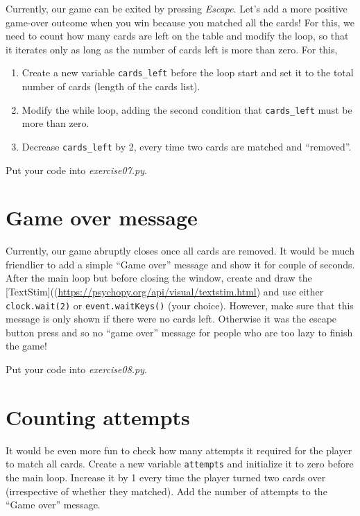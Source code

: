 \documentclass[
]{book}
\providecommand{\tightlist}{%
  \setlength{\itemsep}{0pt}\setlength{\parskip}{0pt}}
\begin{document}
Currently, our game can be exited by pressing \emph{Escape}. Let's add a more positive game-over outcome when you win because you matched all the cards! For this, we need to count how many cards are left on the table and modify the loop, so that it iterates only as long as the number of cards left is more than zero. For this,

\begin{enumerate}
\def\labelenumi{\arabic{enumi}.}
\tightlist
\item
  Create a new variable \texttt{cards\_left} before the loop start and set it to the total number of cards (length of the cards list).
\item
  Modify the while loop, adding the second condition that \texttt{cards\_left} must be more than zero.
\item
  Decrease \texttt{cards\_left} by 2, every time two cards are matched and ``removed''.
\end{enumerate}

Put your code into \emph{exercise07.py}.

\hypertarget{game-over-message}{%
\section{Game over message}\label{game-over-message}}

Currently, our game abruptly closes once all cards are removed. It would be much friendlier to add a simple ``Game over'' message and show it for couple of seconds. After the main loop but before closing the window, create and draw the {[}TextStim{]}((\url{https://psychopy.org/api/visual/textstim.html}) and use either \texttt{clock.wait(2)} or \texttt{event.waitKeys()} (your choice). However, make sure that this message is only shown if there were no cards left. Otherwise it was the escape button press and so no ``game over'' message for people who are too lazy to finish the game!

Put your code into \emph{exercise08.py}.

\hypertarget{counting-attempts}{%
\section{Counting attempts}\label{counting-attempts}}

It would be even more fun to check how many attempts it required for the player to match all cards. Create a new variable \texttt{attempts} and initialize it to zero before the main loop. Increase it by 1 every time the player turned two cards over (irrespective of whether they matched). Add the number of attempts to the ``Game over'' message.
\end{document}
